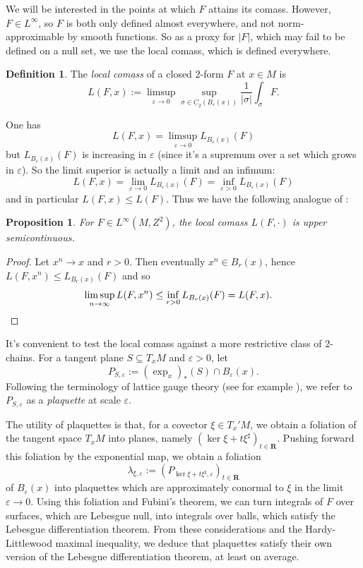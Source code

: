 \documentclass[reqno,11pt]{amsart}
\newcommand{\RR}{\mathbf{R}}
\newcommand{\Chain}{\underline C}
\newcommand{\dfn}[1]{\emph{#1}\index{#1}}
\newtheorem{proposition}[theorem]{Proposition}
\theoremstyle{definition}
\newtheorem{definition}[theorem]{Definition}
\numberwithin{equation}{section}
\begin{document}
We will be interested in the points at which $F$ attains its comass.
However, $F \in L^\infty$, so $F$ is both only defined almost everywhere, and not norm-approximable by smooth functions.
So as a proxy for $|F|$, which may fail to be defined on a null set, we use the local comass, which is defined everywhere.

\begin{definition}
The \dfn{local comass} of a closed $2$-form $F$ at $x \in M$ is 
$$L(F, x) := \limsup_{\varepsilon \to 0} \sup_{\sigma \in \Chain_2(B_\varepsilon(x))} \frac{1}{|\sigma|} \int_\sigma F.$$
\end{definition}

One has
$$L(F, x) = \limsup_{\varepsilon \to 0} L_{B_\varepsilon(x)}(F)$$
but $L_{B_\varepsilon(x)}(F)$ is increasing in $\varepsilon$ (since it's a supremum over a set which grows in $\varepsilon$).
So the limit superior is actually a limit and an infimum:
$$L(F, x) = \lim_{\varepsilon \to 0} L_{B_\varepsilon(x)}(F) = \inf_{\varepsilon > 0} L_{B_\varepsilon(x)}(F)$$
and in particular $L(F, x) \leq L(F)$. Thus we have the following analogue of \cite[Lemma 4.3(a)]{Crandall2008}:

\begin{proposition}
For $F \in L^\infty(M, Z^2)$, the local comass $L(F, \cdot)$ is upper semicontinuous. \label{crandall usc}
\end{proposition}
\begin{proof}
Let $x^n \to x$ and $r > 0$. Then eventually $x^n \in B_r(x)$, hence $L(F, x^n) \leq L_{B_r(x)}(F)$ and so
\begin{align*}
\limsup_{n \to \infty} L(F, x^n) &\leq \inf_{r > 0} L_{B_r(x)}(F) = L(F, x). \qedhere 
\end{align*}
\end{proof}

It's convenient to test the local comass against a more restrictive class of $2$-chains.
For a tangent plane $S \subseteq T_x M$ and $\varepsilon > 0$, let
$$P_{S, \varepsilon} := (\exp_x)_*(S) \cap B_\varepsilon(x).$$
Following the terminology of lattice gauge theory (see for example \cite{Gupta98}), we refer to $P_{S, \varepsilon}$ as a \dfn{plaquette} at scale $\varepsilon$.

The utility of plaquettes is that, for a covector $\xi \in T_x' M$, we obtain a foliation of the tangent space $T_x M$ into planes, namely $(\ker \xi + t\xi^\sharp)_{t \in \RR}$.
Pushing forward this foliation by the exponential map, we obtain a foliation
$$\lambda_{\xi, \varepsilon} := (P_{\ker \xi + t\xi^\sharp, \varepsilon})_{t \in \RR}$$
of $B_\varepsilon(x)$ into plaquettes which are approximately conormal to $\xi$ in the limit $\varepsilon \to 0$.
Using this foliation and Fubini's theorem, we can turn integrals of $F$ over surfaces, which are Lebesgue null, into integrals over balls, which satisfy the Lebesgue differentiation theorem.
From these considerations and the Hardy-Littlewood maximal inequality, we deduce that plaquettes satisfy their own version of the Lebesgue differentiation theorem, at least on average.
\end{document}
